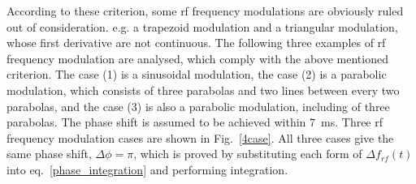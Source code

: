According to these criterion, some rf frequency modulations are obviously ruled out of consideration. e.g. a trapezoid modulation and a triangular modulation, whose first derivative are not continuous. The following three examples of rf frequency modulation are analysed, which comply with the above mentioned criterion. The case (1) is a sinusoidal modulation, the case (2) is a parabolic modulation, which consists of three parabolas and two lines between every two parabolas, and the case (3) is also a parabolic modulation, including of three parabolas. The phase shift is assumed to be achieved within \SI{7}{ms}. Three rf frequency modulation cases are shown in Fig.~\ref{4case}. All three cases give the same phase shift, $\Delta \phi=\pi$, which is proved by substituting each form of $\Delta f_{rf}(t)$ into eq.~\ref{phase_integration} and performing integration. 

%
%
%
%

